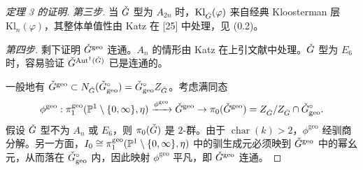 \begin{proof}[定理 3 的证明]
\emph{第三步.} 当 $\check G$ 型为 $A_{2n}$ 时，$\mathrm{Kl}_{\check G}(\varphi)$ 来自经典 Kloosterman 层 $\mathrm{Kl}_n(\varphi)$，其整体单值性由 Katz 在 [25] 中处理，见 (0.2)。

\emph{第四步.} 剩下证明 $\check G^{\mathrm{geo}}$ 连通。$A_n$ 的情形由 Katz 在上引文献中处理。$\check G$ 型为 $E_6$ 时，容易验证 $\check G^{\operatorname{Aut}^\dagger(\check G)}$ 已是连通的。

一般地有 $\check G^{\mathrm{geo}}\subset N_{\check G}(\check G^\circ_{\mathrm{geo}})=\check G^\circ_{\mathrm{geo}}Z_{\check G}$。考虑满同态
\[
\phi^{\mathrm{geo}}:\pi_1^{\mathrm{geo}}(\mathbb{P}^1\setminus\{0,\infty\},\eta)\xrightarrow{\phi^{\mathrm{geo}}}\check G^{\mathrm{geo}}\to\pi_0(\check G^{\mathrm{geo}})=Z_{\check G}/Z_{\check G}\cap\check G^\circ_{\mathrm{geo}}.
\]
假设 $\check G$ 型不为 $A_n$ 或 $E_6$，则 $\pi_0(\check G)$ 是 $2$-群。由于 $\operatorname{char}(k)>2$，$\phi^{\mathrm{geo}}$ 经驯商分解。另一方面，$I_0\cong\pi_1^{\mathrm{geo}}(\mathbb{P}^1\setminus\{0,\infty\},\eta)$ 中的驯生成元必须映到 $\check G^{\mathrm{geo}}$ 中的幂幺元，从而落在 $\check G^\circ_{\mathrm{geo}}$ 内，因此映射 $\phi^{\mathrm{geo}}$ 平凡，即 $\check G^{\mathrm{geo}}$ 连通。
\end{proof}
